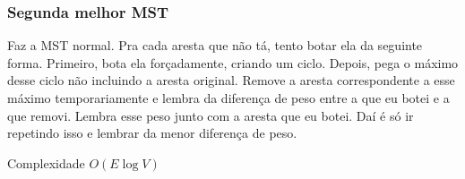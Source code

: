 \subsubsection{Segunda melhor MST}

Faz a MST normal. Pra cada aresta que não tá, tento botar ela da seguinte forma.
Primeiro, bota ela forçadamente, criando um ciclo. Depois, pega o máximo desse ciclo
não incluindo a aresta original. Remove a aresta correspondente a esse máximo temporariamente
e lembra da diferença de peso entre a que eu botei e a que removi. Lembra esse peso junto 
com a aresta que eu botei. Daí é só ir repetindo isso e lembrar da menor diferença de peso.

Complexidade $O(E \log V)$

